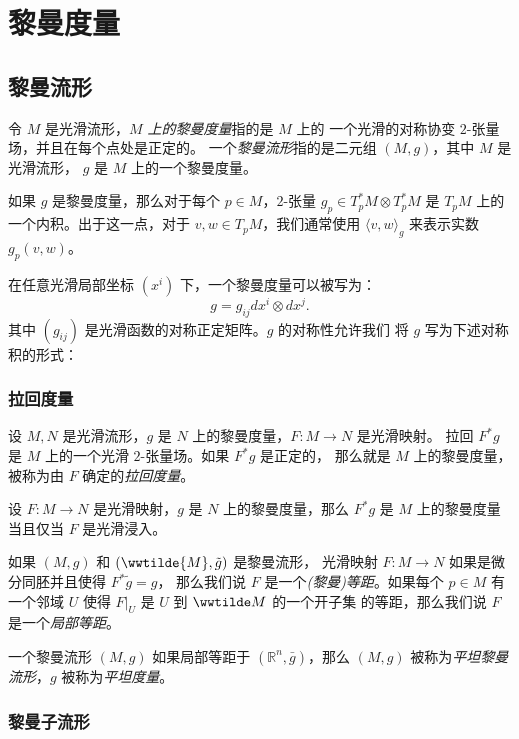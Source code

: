 \documentclass[fontset=none]{Notes}
\begin{document}
 


\chapter{黎曼度量}

\section{黎曼流形}

令 $M$ 是光滑流形，\emph{$M$ 上的黎曼度量}指的是 $M$ 上的
一个光滑的对称协变 $2$-张量场，并且在每个点处是正定的。
一个\emph{黎曼流形}指的是二元组 $(M,g)$，其中 $M$ 是光滑流形，
$g$ 是 $M$ 上的一个黎曼度量。

如果 $g$ 是黎曼度量，那么对于每个 $p\in M$，$2$-张量 $g_p\in T_p^*M\otimes T_p^*M$
是 $T_pM$ 上的一个内积。出于这一点，对于 $v,w\in T_pM$，我们通常使用 $\langle v,w\rangle_g$
来表示实数 $g_p(v,w)$。

在任意光滑局部坐标 $\left(x^i\right)$ 下，一个黎曼度量可以被写为：
\[
  g=g_{ij}dx^i\otimes dx^j.  
\]
其中 $(g_{ij})$ 是光滑函数的对称正定矩阵。$g$ 的对称性允许我们
将 $g$ 写为下述对称积的形式：


\subsection{拉回度量}

设 $M,N$ 是光滑流形，$g$ 是 $N$ 上的黎曼度量，$F:M\to N$ 是光滑映射。
拉回 $F^*g$ 是 $M$ 上的一个光滑 $2$-张量场。如果 $F^*g$ 是正定的，
那么就是 $M$ 上的黎曼度量，被称为由 $F$ 确定的\emph{拉回度量}。

\begin{proposition}[拉回度量判别法]
  设 $F:M\to N$ 是光滑映射，$g$ 是 $N$ 上的黎曼度量，那么 
  $F^*g$ 是 $M$ 上的黎曼度量当且仅当 $F$ 是光滑浸入。
\end{proposition}

如果 $(M,g)$ 和 $(\wwtilde{M},\tilde g)$ 是黎曼流形，
光滑映射 $F:M\to N$ 如果是微分同胚并且使得 $F^*\tilde g=g$，
那么我们说 $F$ 是一个\emph{(黎曼)等距}。如果每个 $p\in M$
有一个邻域 $U$ 使得 $F|_U$ 是 $U$ 到 $\wwtilde M$ 的一个开子集
的等距，那么我们说 $F$ 是一个\emph{局部等距}。

一个黎曼流形 $(M,g)$ 如果局部等距于 $(\mathbb{R}^n,\bar g)$，那么
$(M,g)$ 被称为\emph{平坦黎曼流形}，$g$ 被称为\emph{平坦度量}。

\subsection{黎曼子流形}
\end{document}
